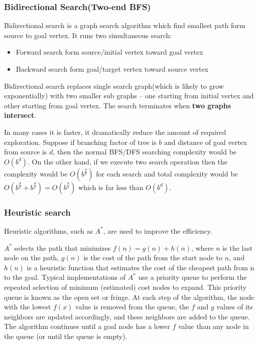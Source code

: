 \documentclass[11pt]{article}
\begin{document}
\subsubsection{Bidirectional Search(Two-end BFS)}
Bidirectional search is a graph search algorithm which find smallest path form source to goal vertex. It runs two simultaneous search:

\begin{itemize}
	\item Forward search form source/initial vertex toward goal vertex
	\item Backward search form goal/target vertex toward source vertex
\end{itemize}

Bidirectional search replaces single search graph(which is likely to grow exponentially) with two smaller sub graphs – one starting from initial vertex and other starting from goal vertex. The search terminates when \textbf{two graphs intersect}.

In many cases it is faster, it dramatically reduce the amount of required exploration. Suppose if branching factor of tree is $b$ and distance of goal vertex from source is $d$, then the normal BFS/DFS searching complexity would be $O(b^d)$. On the other hand, if we execute two search operation then the complexity would be $O(b^{\frac{d}{2}})$ for each search and total complexity would be $O(b^{\frac{d}{2}}+b^{\frac{d}{2}})=O(b^{\frac{d}{2}})$ which is far less than $O(b^d)$.
\subsubsection{Heuristic search}
Heuristic algorithms, such as $A^*$, are used to improve the efficiency.

$A^*$ selects the path that minimizes $f(n)=g(n)+h(n)$, where $n$ is the last node on the path, $g(n)$ is the cost of the path from the start node to $n$, and $h(n)$ is a heuristic function that estimates the cost of the cheapest path from n to the goal.
Typical implementations of $A^*$ use a priority queue to perform the repeated selection of minimum (estimated)
cost nodes to expand. This priority queue is known as the open set or fringe. At each step of the algorithm, the node with the lowest $f(x)$ value is removed from the queue, the $f$ and $g$ values of its neighbors are updated accordingly, and these neighbors are added to the queue. The algorithm continues until a goal node has a lower $f$ value than any node in the queue (or until the queue is empty).
\end{document}
